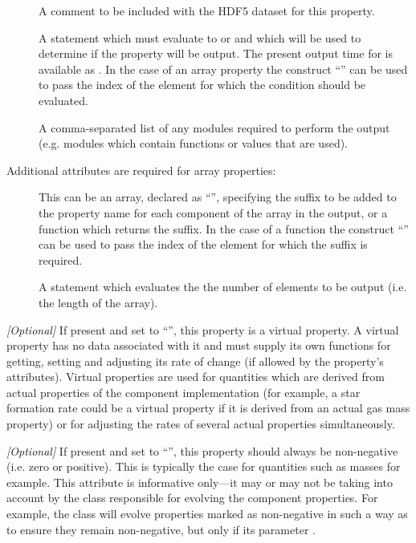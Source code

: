 \begin{description}
\begin{description}
\begin{description}
\item [] A comment to be included with the HDF5 dataset for this property.
\item [] A statement which must evaluate to  or  and which will be used to determine if the property will be output. The present output time for is available as . In the case of an array property the construct ``'' can be used to pass the index of the element for which the condition should be evaluated.
\item [] A comma-separated list of any modules required to perform the output (e.g. modules which contain functions or values that are used).
\end{description}
Additional attributes are required for array properties:
\begin{description}
\item [] This can be an array, declared as ``\mono{[$L_1$,\ldots,$L_N$]}'', specifying the suffix to be added to the property name for each component of the array in the output, or a function which returns the suffix. In the case of a function the construct ``'' can be used to pass the index of the element for which the suffix is required.
\item [] A statement which evaluates the the number of elements to be output (i.e. the length of the array).
\end{description}
\item [\mono{isVirtual}] \emph{[Optional]} If present and set to ``'', this property is a virtual property. A virtual property has no data associated with it and must supply its own functions for getting, setting and adjusting its rate of change (if allowed by the property's attributes). Virtual properties are used for quantities which are derived from actual properties of the component implementation (for example, a star formation rate could be a virtual property if it is derived from an actual gas mass property) or for adjusting the rates of several actual properties simultaneously.
\item [\mono{isNonNegative}] \emph{[Optional]} If present and set to ``'', this property should always be non-negative (i.e. zero or positive). This is typically the case for quantities such as masses for example. This attribute is informative only---it may or may not be taking into account by the class responsible for evolving the component properties. For example, the  class will evolve properties marked as non-negative in such a way as to ensure they remain non-negative, but only if its parameter .

\end{description}
\end{description}
